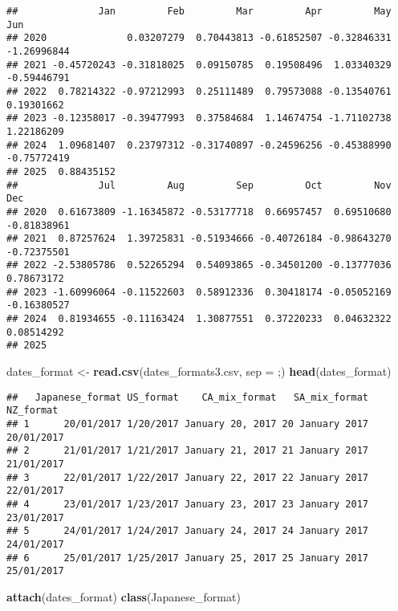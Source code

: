 \documentclass[
]{article}
\newenvironment{Shaded}{\begin{snugshade}}{\end{snugshade}}
\newcommand{\AttributeTok}[1]{\textcolor[rgb]{0.13,0.29,0.53}{#1}}
\newcommand{\FunctionTok}[1]{\textcolor[rgb]{0.13,0.29,0.53}{\textbf{#1}}}
\newcommand{\NormalTok}[1]{#1}
\newcommand{\OtherTok}[1]{\textcolor[rgb]{0.56,0.35,0.01}{#1}}
\newcommand{\StringTok}[1]{\textcolor[rgb]{0.31,0.60,0.02}{#1}}
\begin{document}
\begin{verbatim}
##              Jan         Feb         Mar         Apr         May         Jun
## 2020              0.03207279  0.70443813 -0.61852507 -0.32846331 -1.26996844
## 2021 -0.45720243 -0.31818025  0.09150785  0.19508496  1.03340329 -0.59446791
## 2022  0.78214322 -0.97212993  0.25111489  0.79573088 -0.13540761  0.19301662
## 2023 -0.12358017 -0.39477993  0.37584684  1.14674754 -1.71102738  1.22186209
## 2024  1.09681407  0.23797312 -0.31740897 -0.24596256 -0.45388990 -0.75772419
## 2025  0.88435152                                                            
##              Jul         Aug         Sep         Oct         Nov         Dec
## 2020  0.61673809 -1.16345872 -0.53177718  0.66957457  0.69510680 -0.81838961
## 2021  0.87257624  1.39725831 -0.51934666 -0.40726184 -0.98643270 -0.72375501
## 2022 -2.53805786  0.52265294  0.54093865 -0.34501200 -0.13777036  0.78673172
## 2023 -1.60996064 -0.11522603  0.58912336  0.30418174 -0.05052169 -0.16380527
## 2024  0.81934655 -0.11163424  1.30877551  0.37220233  0.04632322  0.08514292
## 2025
\end{verbatim}

\begin{Shaded}
\begin{Highlighting}[]
\NormalTok{dates\_format }\OtherTok{\textless{}{-}} \FunctionTok{read.csv}\NormalTok{(}\StringTok{\textquotesingle{}dates\_formats3.csv\textquotesingle{}}\NormalTok{, }\AttributeTok{sep =} \StringTok{\textquotesingle{};\textquotesingle{}}\NormalTok{)}
\FunctionTok{head}\NormalTok{(dates\_format)}
\end{Highlighting}
\end{Shaded}

\begin{verbatim}
##   Japanese_format US_format    CA_mix_format   SA_mix_format  NZ_format
## 1      20/01/2017 1/20/2017 January 20, 2017 20 January 2017 20/01/2017
## 2      21/01/2017 1/21/2017 January 21, 2017 21 January 2017 21/01/2017
## 3      22/01/2017 1/22/2017 January 22, 2017 22 January 2017 22/01/2017
## 4      23/01/2017 1/23/2017 January 23, 2017 23 January 2017 23/01/2017
## 5      24/01/2017 1/24/2017 January 24, 2017 24 January 2017 24/01/2017
## 6      25/01/2017 1/25/2017 January 25, 2017 25 January 2017 25/01/2017
\end{verbatim}

\begin{Shaded}
\begin{Highlighting}[]
\FunctionTok{attach}\NormalTok{(dates\_format)}
\FunctionTok{class}\NormalTok{(Japanese\_format)}
\end{Highlighting}
\end{Shaded}
\end{document}
